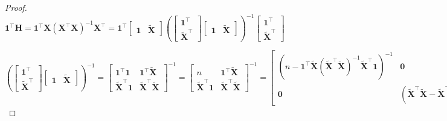\documentclass{beamer}
\begin{document}
\iffalse
\begin{proof}
$\mathbf{1}^\top\mathbf{H}=\mathbf{1}^\top\mathbf{X}(\mathbf{X}^\top\mathbf{X})^{-1}\mathbf{X}^\top=\mathbf{1}^\top\begin{bmatrix}\mathbf{1} & \mathbf{\tilde{X}}\end{bmatrix}\left(\begin{bmatrix}\mathbf{1}^\top\\\mathbf{\tilde{X}}^\top\end{bmatrix}\begin{bmatrix}\mathbf{1} & \mathbf{\tilde{X}}\end{bmatrix}\right)^{-1}\begin{bmatrix}\mathbf{1}^\top\\\mathbf{\tilde{X}}^\top\end{bmatrix}$

$\left(\begin{bmatrix}\mathbf{1}^\top\\\mathbf{\tilde{X}}^\top\end{bmatrix}\begin{bmatrix}\mathbf{1} & \mathbf{\tilde{X}}\end{bmatrix}\right)^{-1}=\begin{bmatrix}
\mathbf{1}^\top\mathbf{1} & \mathbf{1}^\top\mathbf{\tilde{X}}\\
\mathbf{\tilde{X}}^\top\mathbf{1} & \mathbf{\tilde{X}}^\top\mathbf{\tilde{X}}
\end{bmatrix}^{-1}=\begin{bmatrix}
n & \mathbf{1}^\top\mathbf{\tilde{X}}\\
\mathbf{\tilde{X}}^\top\mathbf{1} & \mathbf{\tilde{X}}^\top\mathbf{\tilde{X}}
\end{bmatrix}^{-1}=\begin{bmatrix}
(n-\mathbf{1}^\top\mathbf{\tilde{X}}(\mathbf{\tilde{X}}^\top\mathbf{\tilde{X}})^{-1}\mathbf{\tilde{X}}^\top\mathbf{1})^{-1} & \mathbf{0}\\
\mathbf{0} & (\mathbf{\tilde{X}}^\top\mathbf{\tilde{X}}-\mathbf{\tilde{X}}^\top\mathbf{1}n^{-1}\mathbf{1}^\top\mathbf{\tilde{X}})^{-1}\end{bmatrix}\begin{bmatrix}1 & -\mathbf{1}^\top\mathbf{\tilde{X}}(\mathbf{\tilde{X}}^\top\mathbf{\tilde{X}})^{-1}\\
-\mathbf{\tilde{X}}^\top\mathbf{1}n^{-1} & \mathbf{I}
\end{bmatrix}$


\end{proof}
\end{document}
